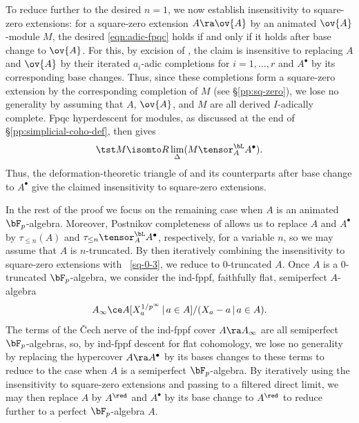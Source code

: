 To reduce further to the desired $n = 1$, we now establish insensitivity to square-zero extensions: for a square-zero extension $A \ra \ov{A}$ by an animated $\ov{A}$-module $M$, the desired \eqref{eqn:adic-fpqc} holds if and only if it holds after base change to $\ov{A}$. For this, by excision of , the claim is insensitive to replacing $A$ and $\ov{A}$ by their iterated $a_i$-adic completions for $i = 1, \dotsc, r$ and $A^\bullet$ by its corresponding base changes. Thus, since these completions form a square-zero extension by the corresponding completion of $M$ (see \S\ref{pp:sq-zero}), we lose no generality by assuming that $A$, $\ov{A}$, and $M$ are all derived $I$-adically complete. Fpqc hyperdescent for modules, as discussed at the end of \S\ref{pp:simplicial-coho-def}, then gives
\[
\tst M \isomto R\lim_\Delta(M \tensor^\bL_A A^\bullet).
\]
Thus, the deformation-theoretic triangle of  and its counterparts after base change to $A^\bullet$ give the claimed insensitivity to square-zero extensions.

In the rest of the proof we focus on the remaining case when $A$ is an animated $\bF_p$-algebra. Moreover, Postnikov completeness of  allows us to replace $A$ and $A^\bullet$ by $\tau_{\le n}(A)$ and $\tau_{\le n} \tensor^\bL_A A^\bullet$, respectively,  for a variable $n$, so %
we may assume that $A$ is $n$-truncated. By then iteratively combining the insensitivity to square-zero extensions with ~\ref{sq-0-3}, we reduce to $0$-truncated $A$. Once $A$ is a $0$-truncated $\bF_p$-algebra, we consider the ind-fppf, faithfully flat, semiperfect $A$-algebra
\[
A_\infty \ce A[X_a^{1/p^\infty}\, |\, a \in A]/(X_a - a\, |\, a \in A).
\]
The terms of the \v{C}ech nerve of the ind-fppf cover $A \ra A_\infty$ are all semiperfect $\bF_p$-algebras, so, by ind-fppf descent for flat cohomology, we lose no generality by replacing the hypercover $A \ra A^\bullet$ by its bases changes to these terms to reduce to the case when $A$ is a semiperfect $\bF_p$-algebra. By iteratively using the insensitivity to square-zero extensions and passing to a filtered direct limit, we may then replace $A$ by $A^\red$ and $A^\bullet$ by its base change to $A^\red$ to reduce further to a perfect $\bF_p$-algebra $A$.

